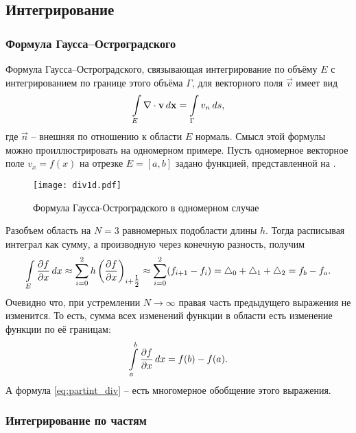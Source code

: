 \subsection{Интегрирование}
\label{sec:partint} 

\subsubsection{Формула Гаусса--Остроградского}

Формула Гаусса--Остроградского, связывающая
интегрирование по объёму $E$ с интегрированием по границе этого объёма $\Gamma$,
для векторного поля $\vec v$ имеет вид
\begin{equation}
\label{eq:partint_div}
\arint{\nabla\cdot\vec v}{E}{\vec x} = \arint{v_n}{\Gamma}{s},
\end{equation}
где $\vec n$ -- внешняя по отношению к области $E$ нормаль.
Смысл этой формулы можно проиллюстрировать на одномерном примере.
Пусть одномерное векторное поле $v_x = f(x)$ на отрезке $E = [a, b]$ задано
функцией, представленной на .
\begin{figure}[h!]
\centering
\texttt{[image: div1d.pdf]}
\caption{Формула Гаусса-Остроградского в одномерном случае}
\label{fig:div1d}
\end{figure}
Разобъем область на $N=3$ равномерных подобласти длины $h$. Тогда
расписывая интеграл как сумму, а производную через конечную разность, получим
$$
\arint{\dfr{f}{x}}{E}{x} \approx \sum_{i=0}^{2} h \left(\dfr{f}{x}\right)_{i+\tfrac12}
\approx\sum_{i=0}^{2}(f_{i+1} - f_{i})
= \triangle_0 + \triangle_1 + \triangle_2 = f_b - f_a.
$$
Очевидно что, при устремлении $N\to\infty$ правая часть предыдущего выражения не изменится.
То есть, сумма всех изменений функции в области есть изменение функции по её границам:
$$
\int\limits_{a}^{b}\dfr{f}{x}\,dx = f(b) - f(a).
$$
А формула \cref{eq:partint_div} -- есть многомерное обобщение этого выражения.

\subsubsection{Интегрирование по частям}

